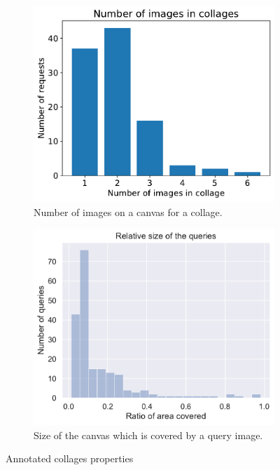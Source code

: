 \begin{figure}
     \centering
     \begin{subfigure}[b]{0.48\textwidth}
         \centering
         \includegraphics[width=\textwidth]{graphs/num_queries_in_request.pdf}
         \caption{Number of images on a canvas for a collage.}
         \label{fig:y equals x}
     \end{subfigure}
     \hfill
     \begin{subfigure}[b]{0.48\textwidth}
         \centering
         \includegraphics[width=\textwidth]{graphs/queries_size.pdf}
         \caption{Size of the canvas which is covered by a query image.}
         \label{fig:three sin x}
     \end{subfigure}
    
    \caption{Annotated collages properties}
    \label{fig:annotated_dataset}
\end{figure}

